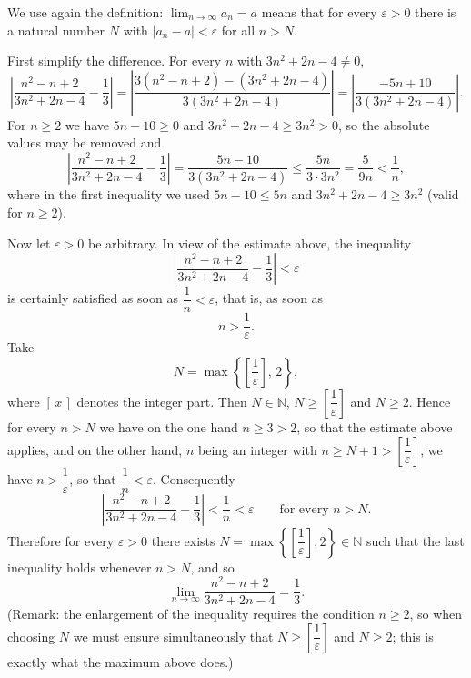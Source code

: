 \documentclass[11pt,a4paper]{article}
\newenvironment{solution}[1]{%
  \par\addvspace{1.7ex}%
  \noindent{\color{solutioncolor}\textbf{#1}}\hspace{0.55em}\ignorespaces}%
  {\par\addvspace{0.9ex}}
\begin{document}
\begin{solution}{Solution 2.1.3}\label{es:2.1.3}
We use again the definition: $\displaystyle\lim_{n\to\infty}a_{n}=a$ means that for every $\varepsilon>0$ there is a natural number $N$ with $\lvert a_{n}-a\rvert<\varepsilon$ for all $n>N$.

First simplify the difference. For every $n$ with $3n^{2}+2n-4\neq 0$,
\[
\left\lvert\frac{n^{2}-n+2}{3n^{2}+2n-4}-\frac{1}{3}\right\rvert
=\left\lvert\frac{3(n^{2}-n+2)-(3n^{2}+2n-4)}{3(3n^{2}+2n-4)}\right\rvert
=\left\lvert\frac{-5n+10}{3(3n^{2}+2n-4)}\right\rvert .
\]
For $n\ge 2$ we have $5n-10\ge 0$ and $3n^{2}+2n-4\ge 3n^{2}>0$, so the absolute values may be removed and
\[
\left\lvert\frac{n^{2}-n+2}{3n^{2}+2n-4}-\frac{1}{3}\right\rvert
=\frac{5n-10}{3(3n^{2}+2n-4)}
\le\frac{5n}{3\cdot 3n^{2}}
=\frac{5}{9n}
<\frac{1}{n},
\]
where in the first inequality we used $5n-10\le 5n$ and $3n^{2}+2n-4\ge 3n^{2}$ (valid for $n\ge 2$).

Now let $\varepsilon>0$ be arbitrary. In view of the estimate above, the inequality
\[
\left\lvert\frac{n^{2}-n+2}{3n^{2}+2n-4}-\frac{1}{3}\right\rvert<\varepsilon
\]
is certainly satisfied as soon as $\dfrac{1}{n}<\varepsilon$, that is, as soon as
\[
n>\frac{1}{\varepsilon}.
\]
Take
\[
N=\max\left\{\left[\frac{1}{\varepsilon}\right],\,2\right\},
\]
where $[\,x\,]$ denotes the integer part. Then $N\in\mathbb{N}$, $N\ge \left[\dfrac{1}{\varepsilon}\right]$ and $N\ge 2$. Hence for every $n>N$ we have on the one hand $n\ge 3>2$, so that the estimate above applies, and on the other hand, $n$ being an integer with $n\ge N+1>\left[\dfrac{1}{\varepsilon}\right]$, we have $n>\dfrac{1}{\varepsilon}$, so that $\dfrac{1}{n}<\varepsilon$. Consequently
\[
\left\lvert\frac{n^{2}-n+2}{3n^{2}+2n-4}-\frac{1}{3}\right\rvert<\frac{1}{n}<\varepsilon
\qquad\text{for every } n>N .
\]
Therefore for every $\varepsilon>0$ there exists $N=\max\left\{\left[\dfrac{1}{\varepsilon}\right],2\right\}\in\mathbb{N}$ such that the last inequality holds whenever $n>N$, and so
\[
\lim_{n\to\infty}\frac{n^{2}-n+2}{3n^{2}+2n-4}=\frac{1}{3}.
\]
(Remark: the enlargement of the inequality requires the condition $n\ge 2$, so when choosing $N$ we must ensure simultaneously that $N\ge\left[\dfrac{1}{\varepsilon}\right]$ and $N\ge 2$; this is exactly what the maximum above does.)
\end{solution}
\end{document}
